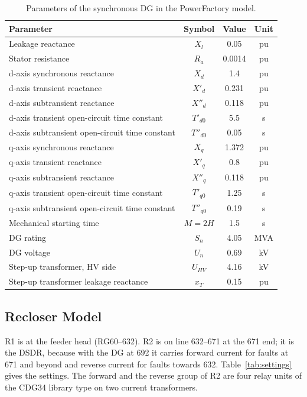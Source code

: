 \documentclass[12pt,a4paper]{article}
\newcommand{\PF}{PowerFactory}
\begin{document}
\begin{table}[H]
\centering\small
\begin{tabular}{|l|c|c|c|}
\hline
\textbf{Parameter} & \textbf{Symbol} & \textbf{Value} & \textbf{Unit} \\ \hline
Leakage reactance & $X_l$ & 0.05 & pu \\ \hline
Stator resistance & $R_a$ & 0.0014 & pu \\ \hline
d-axis synchronous reactance & $X_d$ & 1.4 & pu \\ \hline
d-axis transient reactance & $X'_d$ & 0.231 & pu \\ \hline
d-axis subtransient reactance & $X''_d$ & 0.118 & pu \\ \hline
d-axis transient open-circuit time constant & $T'_{d0}$ & 5.5 & s \\ \hline
d-axis subtransient open-circuit time constant & $T''_{d0}$ & 0.05 & s \\ \hline
q-axis synchronous reactance & $X_q$ & 1.372 & pu \\ \hline
q-axis transient reactance & $X'_q$ & 0.8 & pu \\ \hline
q-axis subtransient reactance & $X''_q$ & 0.118 & pu \\ \hline
q-axis transient open-circuit time constant & $T'_{q0}$ & 1.25 & s \\ \hline
q-axis subtransient open-circuit time constant & $T''_{q0}$ & 0.19 & s \\ \hline
Mechanical starting time & $M = 2H$ & 1.5 & s \\ \hline
DG rating & $S_n$ & 4.05 & MVA \\ \hline
DG voltage & $U_n$ & 0.69 & kV \\ \hline
Step-up transformer, HV side & $U_{HV}$ & 4.16 & kV \\ \hline
Step-up transformer leakage reactance & $x_T$ & 0.15 & pu \\ \hline
\end{tabular}
\caption{Parameters of the synchronous DG in the \PF{} model.}
\label{tab:dg}
\end{table}

\subsection{Recloser Model}
R1 is at the feeder head (RG60--632). R2 is on line 632--671 at the 671 end; it is the DSDR, because with the
DG at 692 it carries forward current for faults at 671 and beyond and reverse current for faults towards 632.
Table~\ref{tab:settings} gives the settings. The forward and the reverse group of R2 are four relay units of
the CDG34 library type on two current transformers.
\end{document}
